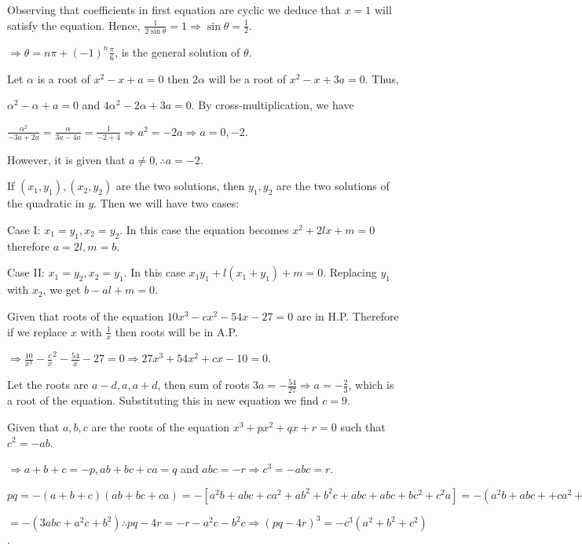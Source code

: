   Observing that coefficients in first equation are cyclic we deduce that $x = 1$ will satisfy the
  equation. Hence, $\frac{1}{2\sin\theta} = 1 \Rightarrow \sin\theta = \frac{1}{2}$.

  $\Rightarrow \theta = n\pi + (-1)^n\frac{\pi}{6}$, is the general solution of $\theta$.
\item Let $\alpha$ is a root of $x^2 - x + a = 0$ then $2\alpha$ will be a root of $x^2 - x + 3a= 0$. Thus,

  $\alpha^2 - \alpha + a = 0$ and $4\alpha^2 - 2\alpha + 3a = 0$. By cross-multiplication, we have

  $\frac{\alpha^2}{-3a + 2a} = \frac{\alpha}{3a - 4a} = \frac{1}{-2 + 4} \Rightarrow a^2 = -2a \Rightarrow a
  = 0, -2$.

  However, it is given that $a\neq 0, \therefore a = -2$.
\item If $(x_1, y_1), (x_2, y_2)$ are the two solutions, then $y_1, y_2$ are the two solutions of the
  quadratic in $y$. Then we will have two cases:

  Case I: $x_1 = y_1, x_2 = y_2$. In this case the equation becomes $x^2 + 2lx + m = 0$ therefore $a = 2l, m
  = b$.

  Case II: $x_1 = y_2, x_2 = y_1$. In this case $x_1y_1 + l(x_1 + y_1) + m = 0$. Replacing $y_1$ with $x_2$,
  we get $b - al + m = 0$.
\item Given that roots of the equation $10x^3 - cx^2 - 54x - 27 = 0$ are in H.P. Therefore if we replace $x$
  with $\frac{1}{x}$ then roots will be in A.P.

  $\Rightarrow \frac{10}{x^3} - \frac{c}{x}^2 - \frac{54}{x} - 27 = 0 \Rightarrow 27x^3 + 54x^2 + cx - 10 =
  0$.

  Let the roots are $a - d, a, a + d$, then sum of roots $3a = -\frac{54}{27}\Rightarrow a = -\frac{2}{3}$,
  which is a root of the equation. Substituting this in new equation we find $c = 9$.
\item Given that $a, b, c$ are the roots of the equation $x^3 + px^2 + qx + r = 0$ such that $c^2 = -ab$.

  $\Rightarrow a + b + c = -p, ab + bc + ca = q$ and $abc = -r \Rightarrow c^3 = -abc = r$.

  $pq = -(a + b + c)(ab + bc + ca) = -[a^2b + abc + ca^2 + ab^2 + b^2c + abc + abc + bc^2 + c^2a] = -(a^2b +
  abc + + ca^2 + ab^2 + b^2c + abc + abc - ab^2 -a^2b)$

  $= -(3abc + a^2c + b^2)\therefore pq - 4r = -r - a^2c - b^2c \Rightarrow (pq - 4r)^3 = -c^3(a^2 + b^2 +
  c^2)$.

